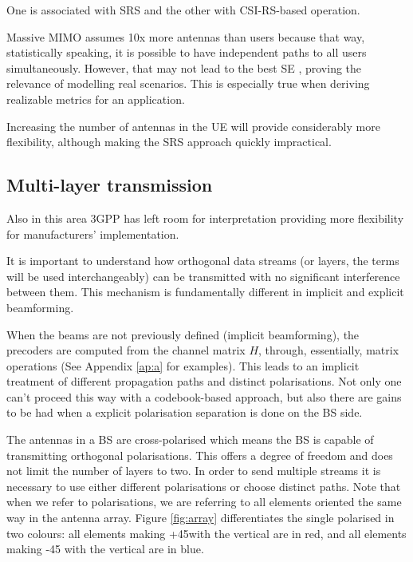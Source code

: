 One is associated with SRS and the other with CSI-RS-based operation.





Massive MIMO assumes 10x more antennas than users because that way, statistically speaking, it is possible to have independent paths to all users simultaneously. However, that may not lead to the best \ac{SE} \cite{7294693}, proving the relevance of modelling real scenarios. This is especially true when deriving realizable metrics for an application. 

Increasing the number of antennas in the UE will provide considerably more flexibility, although making the SRS approach quickly impractical.






\subsection*{Multi-layer transmission}

Also in this area 3GPP has left room for interpretation providing more flexibility for manufacturers' implementation.

It is important to understand how orthogonal data streams (or layers, the terms will be used interchangeably) can be transmitted with no significant interference between them. This mechanism is fundamentally different in implicit and explicit beamforming.

When the beams are not previously defined (implicit beamforming), the precoders are computed from the channel matrix $H$, through, essentially, matrix operations (See Appendix \ref{ap:a} for examples). This leads to an implicit treatment of different propagation paths and distinct polarisations. Not only one can't proceed this way with a codebook-based approach, but also there are gains to be had when a explicit polarisation separation is done on the BS side.

The antennas in a BS are cross-polarised \cite{3gpp-antennas} which means the BS is capable of transmitting orthogonal polarisations. This offers a degree of freedom and does not limit the number of layers to two. In order to send multiple streams it is necessary to use either different polarisations or choose distinct paths. Note that when we refer to polarisations, we are referring to all elements oriented the same way in the antenna array. Figure \ref{fig:array} differentiates the single polarised in two colours: all elements making +45\textdegree with the vertical are in red, and all elements making -45 \textdegree with the vertical are in blue.


